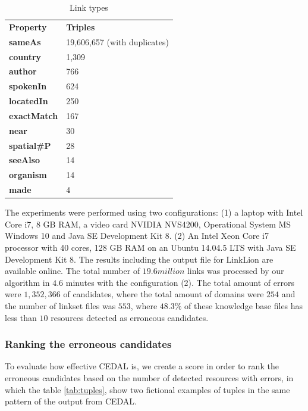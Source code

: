 \begin{table}[H]
	\centering
	\caption{Link types}
	\label{tab:linkTypes}
	\begin{tabular}{ll}
		\hline\noalign{\smallskip}
		\textbf{Property}   & \textbf{Triples}  \\
		\noalign{\smallskip}
		\hline
		\textbf{sameAs}     & 19,606,657 (with duplicates)    \\
		\textbf{country}    & 1,309                 \\
		\textbf{author}     & 766              \\
		\textbf{spokenIn}   & 624                  \\
		\textbf{locatedIn}  & 250                  \\
		\textbf{exactMatch} & 167                 \\
		\textbf{near}       & 30                   \\
		\textbf{spatial\#P} & 28                   \\
		\textbf{seeAlso}    & 14             \\
		\textbf{organism}   & 14      \\
		\textbf{made}       & 4                \\
		\hline           
	\end{tabular}
\end{table}
%
The experiments were performed using two configurations: (1) a laptop with Intel Core i7, 8 GB RAM, a video card NVIDIA NVS4200, Operational System MS Windows 10 and Java SE Development Kit 8. (2) An Intel Xeon Core i7 processor with 40 cores, 128 GB RAM on an Ubuntu 14.04.5 LTS with Java SE Development Kit 8. The results including the output file for LinkLion are available online.
The total number of $19.6 million$ links was processed by our algorithm in $4.6$ minutes with the configuration (2). The total amount of errors were $1,352,366$ of candidates, where the total amount of domains were $254$ and  the number of linkset files was $553$, where $48.3\%$ of these knowledge base files has less than $10$ resources detected as erroneous candidates. 

\subsubsection{Ranking the erroneous candidates}
To evaluate how effective CEDAL is, we create a score in order to rank the erroneous candidates based on the number of detected resources with errors, in which the table \ref{tab:tuples}, show two fictional examples of tuples in the same pattern of the output from CEDAL.

